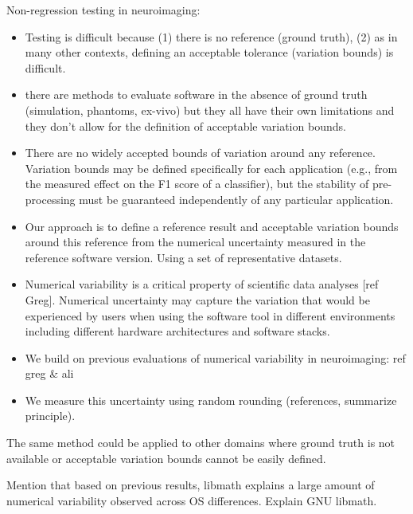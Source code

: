 \documentclass{article}
\begin{document}
Non-regression testing in neuroimaging:
\begin{itemize}
    \item Testing is difficult because (1) there is no reference (ground truth),
          (2) as in many other contexts, defining an acceptable tolerance (variation
          bounds) is difficult.
    \item there are methods to evaluate software in the absence of ground truth
          (simulation, phantoms, ex-vivo) but they all have their own limitations and
          they don't allow for the definition of acceptable variation bounds.
    \item There are no widely accepted bounds of variation around any reference.
          Variation bounds may be defined specifically for each application (e.g.,
          from the measured effect on the F1 score of a classifier), but the stability
          of pre-processing must be guaranteed independently of any particular
          application.
    \item Our approach is to define a reference result and acceptable variation
          bounds around this reference from the numerical uncertainty measured in the
          reference software version. Using a set of representative datasets.
    \item Numerical variability is a critical property of scientific data
          analyses [ref Greg]. Numerical uncertainty may capture the variation that
          would be experienced by users when using the software tool in different
          environments including different hardware architectures and software stacks.
    \item We build on previous evaluations of numerical variability in
          neuroimaging: ref greg \& ali
    \item We measure this uncertainty using random rounding (references,
          summarize principle).
\end{itemize}

\begin{figure}

\end{figure}

The same method could be applied to other domains where ground truth is not
available or acceptable variation bounds cannot be easily defined.

Mention that based on previous results, libmath explains a large amount of
numerical variability observed across OS differences. Explain GNU libmath.
\end{document}

